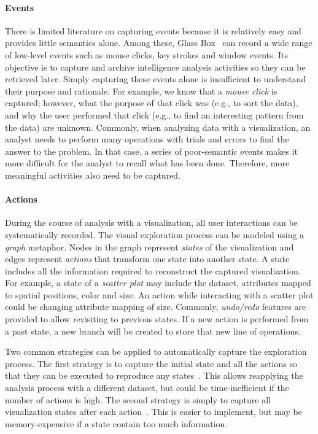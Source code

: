 \paragraph{Events}
There is limited literature on capturing events because it is relatively easy and provides little semantics alone. Among these, Glass Box~\cite{Cowley2006} can record a wide range of low-level events such as mouse clicks, key strokes and window events. Its objective is to capture and archive intelligence analysis activities so they can be retrieved later. Simply capturing these events alone is insufficient to understand their purpose and rationale. For example, we know that a \textit{mouse click} is captured; however, what the purpose of that click was (e.g., to sort the data), and why the user performed that click (e.g., to find an interesting pattern from the data) are unknown. Commonly, when analyzing data with a visualization, an analyst needs to perform many operations with trials and errors to find the answer to the problem. In that case, a series of poor-semantic events makes it more difficult for the analyst to recall what has been done. Therefore, more meaningful activities also need to be captured. 

\paragraph{Actions}
During the course of analysis with a visualization, all user interactions can be systematically recorded. The visual exploration process can be modeled using a \textit{graph} metaphor. Nodes in the graph represent \textit{states} of the visualization and edges represent \textit{actions} that transform one state into another state. A state includes all the information required to reconstruct the captured visualization. For example, a state of a \textit{scatter plot} may include the dataset, attributes mapped to spatial positions, color and size. An action while interacting with a scatter plot could be changing attribute mapping of size. Commonly, \emph{undo/redo} features are provided to allow revisiting to previous states. If a new action is performed from a past state, a new branch will be created to store that new line of operations. 

Two common strategies can be applied to automatically capture the exploration process. The first strategy is to capture the initial state and all the actions so that they can be executed to reproduce any states~\cite{Kadivar2009}. This allows reapplying the analysis process with a different dataset, but could be time-inefficient if the number of actions is high. The second strategy is simply to capture all visualization states after each action~\cite{Bavoil2005}. This is easier to implement, but may be memory-expensive if a state contain too much information.

